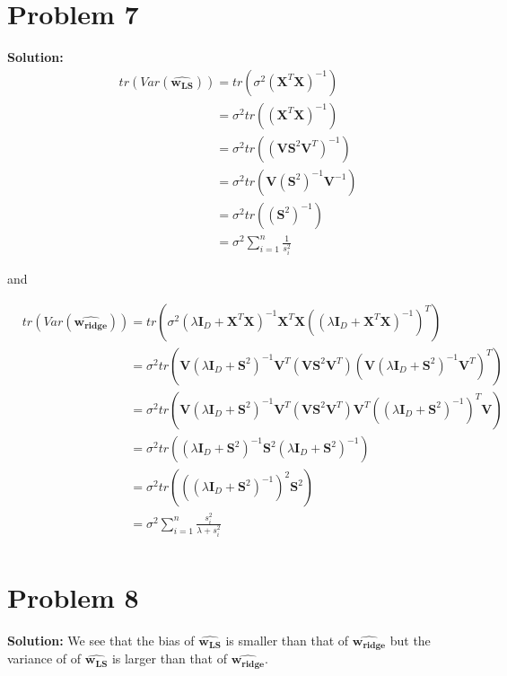 \documentclass[11pt]{article}
\begin{document}
\section*{Problem 7}
\textbf{Solution:}
\begin{align}
	&tr(Var(\hat{\mathbf{w_{LS}}})) = tr(\sigma^2(\mathbf{X}^T\mathbf{X})^{-1})\nonumber\\
	&\phantom{tr(Var(\hat{\mathbf{w_{LS}}}))} = \sigma^2tr((\mathbf{X}^T\mathbf{X})^{-1})\nonumber\\
	&\phantom{tr(Var(\hat{\mathbf{w_{LS}}}))} = \sigma^2tr((\mathbf{V}\mathbf{S}^2\mathbf{V}^T)^{-1})\nonumber\\
	&\phantom{tr(Var(\hat{\mathbf{w_{LS}}}))} = \sigma^2tr(\mathbf{V}(\mathbf{S}^2)^{-1}\mathbf{V}^{-1})\nonumber\\
	&\phantom{tr(Var(\hat{\mathbf{w_{LS}}}))} = \sigma^2tr((\mathbf{S}^2)^{-1})\nonumber\\
	&\phantom{tr(Var(\hat{\mathbf{w_{LS}}}))} = \sigma^2\sum_{i = 1}^n \frac{1}{s_i^2}\nonumber
\end{align}

and

\begin{align}
	&tr(Var(\hat{\mathbf{w_{ridge}}})) = tr(\sigma^2( \lambda \mathbf{I}_D + \mathbf{X}^T\mathbf{X})^{-1}\mathbf{X}^T\mathbf{X}((\lambda \mathbf{I}_D + \mathbf{X}^T\mathbf{X})^{-1})^{T})\nonumber\\
	&\phantom{tr(Var(\hat{\mathbf{w_{ridge}}}))} = \sigma^2tr(\mathbf{V}(\lambda \mathbf{I}_D + \mathbf{S}^2)^{-1}\mathbf{V}^T(\mathbf{V}\mathbf{S}^2\mathbf{V}^T)(\mathbf{V}(\lambda \mathbf{I}_D + \mathbf{S}^2)^{-1}\mathbf{V}^T)^{T})\nonumber\\
	&\phantom{tr(Var(\hat{\mathbf{w_{ridge}}}))} = \sigma^2tr(\mathbf{V}(\lambda \mathbf{I}_D + \mathbf{S}^2)^{-1}\mathbf{V}^T(\mathbf{V}\mathbf{S}^2\mathbf{V}^T)\mathbf{V}^T((\lambda \mathbf{I}_D + \mathbf{S}^2)^{-1})^T\mathbf{V})\nonumber\\
	&\phantom{tr(Var(\hat{\mathbf{w_{ridge}}}))} = \sigma^2tr((\lambda \mathbf{I}_D + \mathbf{S}^2)^{-1}\mathbf{S}^2(\lambda \mathbf{I}_D + \mathbf{S}^2)^{-1})\nonumber\\
	&\phantom{tr(Var(\hat{\mathbf{w_{ridge}}}))} = \sigma^2tr(((\lambda \mathbf{I}_D + \mathbf{S}^2)^{-1})^2\mathbf{S}^2)\nonumber\\
	&\phantom{tr(Var(\hat{\mathbf{w_{ridge}}}))} = \sigma^2 \sum_{i = 1}^n \frac{s_i^2}{\lambda + s_i^2} \nonumber\\
\end{align}
\section*{Problem 8}
\textbf{Solution:}
	We see that the bias of $\hat{\mathbf{w_{LS}}}$ is smaller than that of $\hat{\mathbf{w_{ridge}}}$ but the variance of of $\hat{\mathbf{w_{LS}}}$ is larger than that of $\hat{\mathbf{w_{ridge}}}$.
\newpage \nocite{*}


\end{document}
